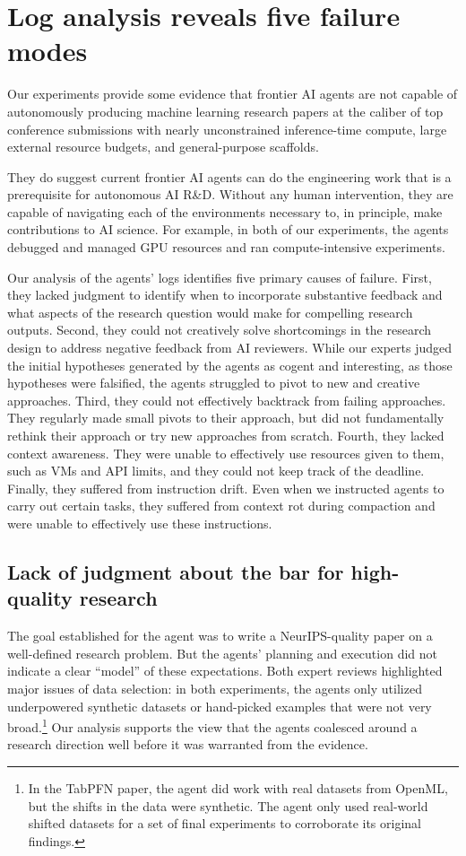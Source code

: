\section{Log analysis reveals five failure modes}
\label{sec:failure-modes}

Our experiments provide some evidence that frontier AI agents are not capable
of autonomously producing machine learning research papers at the caliber of
top conference submissions with nearly unconstrained inference-time compute,
large external resource budgets, and general-purpose scaffolds.

They do suggest current frontier AI agents can do the engineering work that is
a prerequisite for autonomous AI R\&D. Without any human intervention, they
are capable of navigating each of the environments necessary to, in principle,
make contributions to AI science. For example, in both of our experiments, the
agents debugged and managed GPU resources and ran compute-intensive
experiments.

Our analysis of the agents' logs identifies five primary causes of failure.
First, they lacked judgment to identify when to incorporate substantive feedback and what aspects of the research question would make for compelling research outputs. Second, they could not creatively solve shortcomings in the research design to address negative feedback from AI reviewers. While our experts judged the initial hypotheses generated by the agents as cogent and interesting, as those hypotheses were falsified, the agents struggled to pivot to new and creative
approaches. Third, they could not effectively backtrack from failing
approaches. They regularly made small pivots to their approach, but did not
fundamentally rethink their approach or try new approaches from scratch.
Fourth, they lacked context awareness. They were unable to effectively use
resources given to them, such as VMs and API limits, and they could not keep
track of the deadline. Finally, they suffered from instruction drift. Even
when we instructed agents to carry out certain tasks, they suffered from
context rot during compaction and were unable to effectively use these
instructions. 

\subsection{Lack of judgment about the bar for high-quality research}

The goal established for the agent was to write a NeurIPS-quality paper on a
well-defined research problem. But the agents' planning and execution did not
indicate a clear ``model'' of these expectations. Both expert reviews
highlighted major issues of data selection: in both experiments, the agents
only utilized underpowered synthetic datasets or hand-picked examples that
were not very broad.\footnote{In the TabPFN paper, the agent did work with real datasets from OpenML, but the shifts in the data were synthetic. The agent only used real-world shifted datasets for a set of final experiments to corroborate its original findings.} Our analysis supports the view that the agents coalesced
around a research direction well before it was warranted from the evidence.

